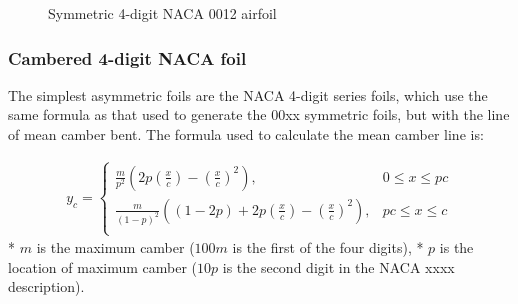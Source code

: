 \documentclass[11pt]{article}
\begin{document}
    
    

    
    
    
    
\begin{figure}
    \begin{center}
    \end{center}
    \caption{Symmetric 4-digit NACA 0012 airfoil}      
    \label{fig:series4sym}
\end{figure}
    
    \hypertarget{cambered-4-digit-naca-foil}{%
\subsubsection{Cambered 4-digit NACA
foil}\label{cambered-4-digit-naca-foil}}

The simplest asymmetric foils are the NACA 4-digit series foils, which
use the same formula as that used to generate the 00xx symmetric foils,
but with the line of mean camber bent. The formula used to calculate the
mean camber line is:

\begin{equation}\label{eq:series4cambered_yc}
    \begin{aligned}
        y_{c} =
        \begin{cases}
            \frac{m}{p^2}\left( 2p\left(\frac{x}{c}\right)-\left(\frac{x}{c}\right)^2 \right), & 0\leq x \leq pc\\
            \frac{m}{(1-p)^2}\left( (1-2p)+2p\left( \frac{x}{c}\right)-\left(\frac{x}{c}\right)^2 \right), & pc \leq x \leq c\\
        \end{cases}
    \end{aligned}
\end{equation} * \(m\) is the maximum camber (\(100 m\) is the first of
the four digits), * \(p\) is the location of maximum camber (\(10 p\) is
the second digit in the NACA xxxx description).
\end{document}
